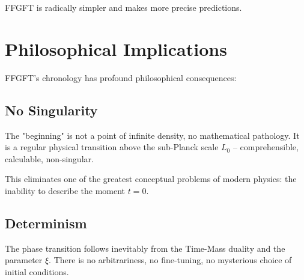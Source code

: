 	\begin{center}
		\small
	\end{center}
	
	FFGFT is radically simpler and makes more precise predictions.
	
	\section{Philosophical Implications}
	
	FFGFT's chronology has profound philosophical consequences:
	
	\subsection{No Singularity}
	
	The "beginning" is not a point of infinite density, no mathematical pathology. It is a regular physical transition above the sub-Planck scale $L_0$ -- comprehensible, calculable, non-singular.
	
	This eliminates one of the greatest conceptual problems of modern physics: the inability to describe the moment $t=0$.
	
	\subsection{Determinism}
	
	The phase transition follows inevitably from the Time-Mass duality and the parameter $\xi$. There is no arbitrariness, no fine-tuning, no mysterious choice of initial conditions.
	
